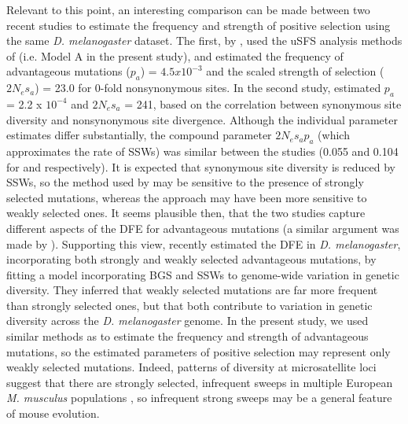 	Relevant to this point, an interesting comparison can be made between two recent studies to estimate the frequency and strength of positive selection using the same \textit{D. melanogaster} dataset. The first, by \cite{RN321}, used the uSFS analysis methods of \cite{RN210} (i.e. Model A in the present study), and estimated the frequency of advantageous mutations ($p_a$) = $4.5 x 10^{-3}$ and the scaled strength of selection ($2N_es_a$) = 23.0 for 0-fold nonsynonymous sites. In the second study,  \cite{RN290} estimated $p_a$ = 2.2 x $10^{-4}$ and $2N_es_a$ = 241, based on the correlation between synonymous site diversity and nonsynonymous site divergence. Although the individual parameter estimates differ substantially, the compound parameter $2N_es_ap_a$ (which approximates the rate of SSWs) was similar between the studies (0.055 and 0.104 for \cite{RN290} and \cite{RN321} respectively). It is expected that synonymous site diversity is reduced by SSWs, so the method used by \cite{RN290} may be sensitive to the presence of strongly selected mutations, whereas the \cite{RN321} approach may have been more sensitive to weakly selected ones. It seems plausible then, that the two studies capture different aspects of the DFE for advantageous mutations (a similar argument was made by \citealt{RN171}). Supporting this view, \cite{RN274} recently estimated the DFE in \textit{D. melanogaster}, incorporating both strongly and weakly selected advantageous mutations, by fitting a model incorporating BGS and SSWs to genome-wide variation in genetic diversity. They inferred that weakly selected mutations are far more frequent than strongly selected ones, but that both contribute to variation in genetic diversity across the \textit{D. melanogaster} genome. In the present study, we used similar methods as \cite{RN321} to estimate the frequency and strength of advantageous mutations, so the estimated parameters of positive selection may represent only weakly selected mutations. Indeed, patterns of diversity at microsatellite loci suggest that there are strongly selected, infrequent sweeps in multiple European \textit{M. musculus} populations \citep{RN355}, so infrequent strong sweeps may be a general feature of mouse evolution.

